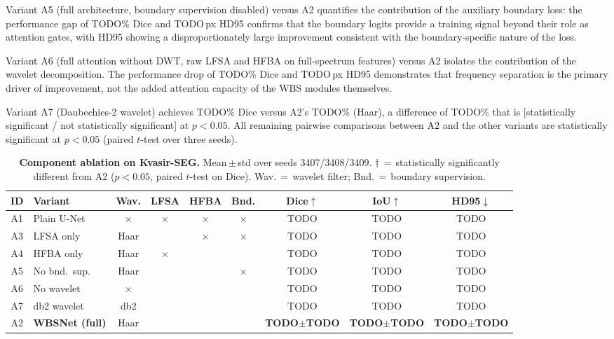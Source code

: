 \documentclass[journal]{IEEEtran}
\newcommand{\Yes}{\checkmark}
\newcommand{\No}{$\times$}
\begin{document}
Variant A5 (full architecture, boundary supervision disabled) versus A2
quantifies the contribution of the auxiliary boundary loss: the performance
gap of TODO\% Dice and TODO\,px HD95 confirms that the boundary logits
provide a training signal beyond their role as attention gates, with HD95
showing a disproportionately large improvement consistent with the
boundary-specific nature of the loss.

Variant A6 (full attention without DWT, raw LFSA and HFBA on full-spectrum
features) versus A2 isolates the contribution of the wavelet decomposition.
The performance drop of TODO\% Dice and TODO\,px HD95 demonstrates that
frequency separation is the primary driver of improvement, not the added
attention capacity of the WBS modules themselves.

Variant A7 (Daubechies-2 wavelet) achieves TODO\% Dice versus A2's
TODO\% (Haar), a difference of TODO\% that is [statistically
significant / not statistically significant] at $p < 0.05$.
All remaining pairwise comparisons between A2 and the other variants are
statistically significant at $p < 0.05$ (paired $t$-test over three seeds).

\begin{table}[t]
  \centering
  \caption{\textbf{Component ablation on Kvasir-SEG.}
    Mean\,$\pm$\,std over seeds 3407/3408/3409.
    $\dagger$\,$=$\,statistically significantly different from A2
    ($p < 0.05$, paired $t$-test on Dice).
    Wav.\,$=$\,wavelet filter; Bnd.\,$=$\,boundary supervision.}
  \label{tab:ablation}
  \setlength{\tabcolsep}{3.5pt}
  \begin{tabular}{@{}clccccccc@{}}
    \toprule
    ID & Variant & Wav. & LFSA & HFBA & Bnd.
       & Dice$\uparrow$ & IoU$\uparrow$ & HD95$\downarrow$ \\
    \midrule
    A1 & Plain U-Net    & \No   & \No  & \No  & \No
       & TODO & TODO & TODO \\
    A3 & LFSA only      & Haar  & \Yes & \No  & \No
       & TODO & TODO & TODO \\
    A4 & HFBA only      & Haar  & \No  & \Yes & \Yes
       & TODO & TODO & TODO \\
    A5 & No bnd.~sup.   & Haar  & \Yes & \Yes & \No
       & TODO & TODO & TODO \\
    A6 & No wavelet     & \No   & \Yes & \Yes & \Yes
       & TODO & TODO & TODO \\
    A7 & db2 wavelet    & db2   & \Yes & \Yes & \Yes
       & TODO & TODO & TODO \\
    \midrule
    A2 & \textbf{WBSNet (full)} & Haar & \Yes & \Yes & \Yes
       & \textbf{TODO$\pm$TODO}
       & \textbf{TODO$\pm$TODO}
       & \textbf{TODO$\pm$TODO} \\
    \bottomrule
  \end{tabular}
\end{table}
\end{document}
